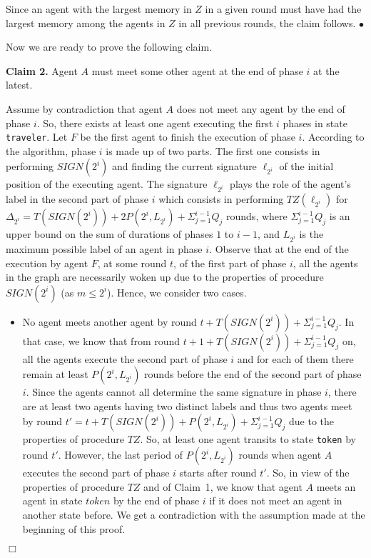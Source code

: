 \documentclass[11pt]{article}
\newcommand{\finclaim}{\hfill $\bullet$}
\newcommand{\qed}{\hfill $\Box$ \bigbreak}
\newenvironment{proof}{\noindent {\bf Proof.}}{\qed}
\begin{document}
\begin{proof}
\begin{itemize}
\end{itemize}

{Since an agent with the largest memory in $Z$ in a given round must have had the largest memory among the agents in $Z$ in all previous rounds, the claim follows.} \finclaim

Now we are ready to prove the following claim.

\vspace*{0.3cm}
\noindent
{{\bf Claim 2.} Agent $A$ must meet some other agent at the end of phase $i$ at the latest.}

{Assume by contradiction that agent $A$ does not meet any agent by the end of phase $i$. So, there exists at least one agent executing the first {$i$ phases} in state {\tt traveler}.
Let $F$ be the first agent to finish the execution of phase $i$. According to the algorithm, phase $i$ is made up of two parts.
The first one consists in performing $SIGN(2^i)$ and finding the current signature $\ell_{2^i}$ of the initial position of the executing agent. The signature $\ell_{2^i}$ plays the role of the agent's label in the second part of phase $i$ which consists in performing $TZ(\ell_{2^i})$ for {$\Delta_{2^i}= T(SIGN(2^i))+2P(2^i,L_{2^i})+ \Sigma_{j=1}^{i-1}Q_j$ rounds, where $\Sigma_{j=1}^{i-1}Q_j$ is an upper bound on the sum of durations of phases $1$ to $i-1$, and $L_{2^i}$ is the maximum possible label of an agent in phase $i$}. Observe that at the end of the execution by agent $F$, at some round $t$, of the first part of phase $i$, all the agents in the graph are necessarily woken up due to the properties of procedure $SIGN(2^i)$ (as $m\leq 2^i$). Hence, we consider two cases.}
\begin{itemize}
\item{No agent meets another agent by round {$t+ T(SIGN(2^i)) +\Sigma_{j=1}^{i-1}Q_j$}. In that case, we know that from round {$t+1+ T(SIGN(2^i)) +\Sigma_{j=1}^{i-1}Q_j$} on, all the agents execute the second part of phase $i$ and for each of them there remain at least $P(2^i,L_{2^i})$ rounds before the end of the second part of phase $i$. Since the agents cannot all determine the same signature in phase $i$, there are at least two agents having two distinct labels and thus two agents meet by round {$t'=t + T(SIGN(2^i)) + P(2^i,L_{2^i})+\Sigma_{j=1}^{i-1}Q_j$} due to the properties of procedure $TZ$. So, at least one agent transits to state {\tt token} by round $t'$. However, the last period of $P(2^i,L_{2^i})$ rounds when agent $A$ executes the second part of phase $i$ starts after round $t'$. So, in view of the properties of procedure $TZ$ and of Claim~1, we know that agent $A$ meets an agent in state $token$ by the end of phase $i$ if it does not meet an agent in another state before. We get a contradiction with the assumption made at the beginning of this proof.}


\end{itemize}
\end{proof}
\end{document}
